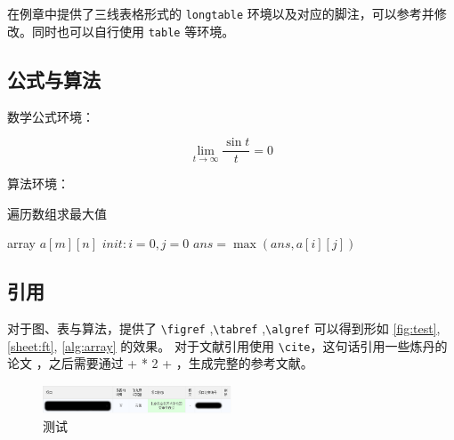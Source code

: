 \documentclass[lang=cn,12pt]{frbpaper}
\begin{document}
在例章中提供了三线表格形式的 \lstinline{longtable} 环境以及对应的脚注，可以参考并修改。同时也可以自行使用 \lstinline{table} 等环境。

\subsection{公式与算法} 

数学公式环境：

\[\lim_{t \rightarrow \infty} \dfrac{\sin t}{t} = 0 \]

算法环境：

\begin{algorithm}
    \caption{遍历数组求最大值}
    \label{alg:array}
    \begin{algorithmic}
        \REQUIRE array \(a[m][n]\)
        \STATE \(init: i = 0, j = 0\)
        \REPEAT 
        \REPEAT
        \STATE \(ans = \max (ans, a[i][j])\)
    \end{algorithmic}
\end{algorithm}

\subsection{引用}

对于图、表与算法，提供了 \lstinline{\figref} ,\lstinline{\tabref} ,\lstinline{\algref} 可以得到形如 \ref{fig:test}, \ref{sheet:ft}, \ref{alg:array} 的效果。
对于文献引用使用 \lstinline{\cite}，这句话引用一些炼丹的论文 \cite{ghostnet,parashar2017scnn,park2017scale,abok}，之后需要通过  +  * 2 + ，生成完整的参考文献。


\begin{figure}[htb]\footnotesize
    \centering
    \includegraphics[width=0.5\textwidth]{figures/pass.png}
    \caption{测试}\label{fig:test}
    \label{fig:01}
\end{figure}
\end{document}
